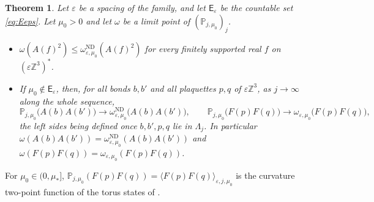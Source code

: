 \documentclass[11pt]{amsart}
\theoremstyle{plain}
\newtheorem{theorem}{Theorem}[section]
\theoremstyle{definition}
\theoremstyle{remark}
\numberwithin{equation}{section}
\newcommand{\Z}{\mathbb{Z}}
\newcommand{\eps}{\varepsilon}
\newcommand{\ev}[1]{\langle #1\rangle}
\begin{document}
\begin{theorem}\label{thm:torus2pt}
Let $\eps$ be a spacing of the family, and let $\mathsf E_\eps$ be the countable set \eqref{eq:Eeps}. Let $\mu_0>0$ and let $\omega$ be a limit point of $(\mathbb P_{j,\mu_0})_j$.
\begin{itemize}
\item[(i)] $\omega(A(f)^2)\le\omega^{\mathrm{ND}}_{\eps,\mu_0}(A(f)^2)$ for every finitely supported real $f$ on $(\eps\Z^3)^*$.
\item[(ii)] If $\mu_0\notin\mathsf E_\eps$, then, for all bonds $b,b'$ and all plaquettes $p,q$ of $\eps\Z^3$, as $j\to\infty$ along the whole sequence,
\[
\mathbb P_{j,\mu_0}\big(A(b)A(b')\big)\to\omega^{\mathrm{ND}}_{\eps,\mu_0}\big(A(b)A(b')\big),\qquad\mathbb P_{j,\mu_0}\big(F(p)F(q)\big)\to\omega_{\eps,\mu_0}\big(F(p)F(q)\big),
\]
the left sides being defined once $b,b',p,q$ lie in $\Lambda_j$. In particular $\omega(A(b)A(b'))=\omega^{\mathrm{ND}}_{\eps,\mu_0}(A(b)A(b'))$ and $\omega(F(p)F(q))=\omega_{\eps,\mu_0}(F(p)F(q))$.
\end{itemize}
\end{theorem}

For $\mu_0\in(0,\mu_*]$, $\mathbb P_{j,\mu_0}(F(p)F(q))=\ev{F(p)F(q)}_{\eps,j,\mu_0}$ is the curvature two-point function of the torus states of \cite{v1}.
\end{document}

